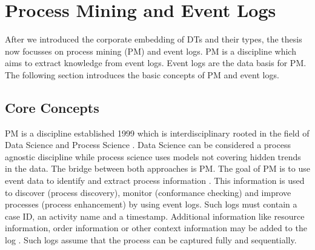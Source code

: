 \section{Process Mining and Event Logs}
\label{sec:process-mining}
After we introduced the corporate embedding of DTs and their types, the thesis now focusses on process mining (PM) and event logs. PM is a discipline which aims to extract knowledge from event logs. Event logs are the data basis for PM. The following section introduces the basic concepts of PM and event logs.

\subsection{Core Concepts}
\label{sec:core-concepts}
PM is a discipline established 1999 which is interdisciplinary rooted in the field of Data Science and Process Science \autocite{van2016data}. Data Science can be considered a process agnostic discipline \autocite{van2016data} while process science uses models not covering hidden trends in the data. The bridge between both approaches is PM. The goal of PM is to use event data to identify and extract process information \autocite{vanderAalst2012}. This information is used to discover (process discovery), monitor (conformance checking) and improve processes (process enhancement) \autocite{vanderAalst2012} by using event logs. Such logs must contain a case ID, an activity name and a timestamp. Additional information like resource information, order information or other context information may be added to the log \autocite{vanderAalst2012}. Such logs assume that the process can be captured fully and sequentially.

